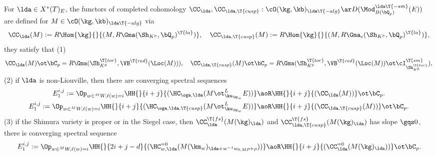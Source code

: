 \documentclass[article, a4paper, twoside]{universal}
\begin{document}
\begin{thm}
    For $\lda\in X^{*}(T)_{E}$, the functors of completed cohomology $\CC_{\lda},\CC_{\lda,\T{cusp}}:\cO(\kg,\kb)_{\lda\T{-alg}}\ar D(\Mod_{B(\bQ_{p})}^{\lda\T{-sm}}(E))$ are defined for $M\in\cO(\kg,\kb)_{\lda\T{-alg}}$ via
    \[
        \CC_{\lda}(M):=R\Hom{\kg}{}{(M,R\Gma(\Sh_{K^{p}},\bQ_{p})^{\T{la}})},\quad \CC_{\lda,\T{cusp}}(M):=R\Hom{\kg}{}{(M,R\Gma_{c}(\Sh_{K^{p}},\bQ_{p})^{\T{la}})},
    \]
    they satisfy that (1)
    \[
        \CC_{\lda}(M)\ot\bC_{p}=R\Gma(\Sh_{K^{p}}^{\T{tor}},\VB^{\T{red}}(\Loc(M))),\quad \CC_{\lda,\T{cusp}}(M)\ot\bC_{p}=R\Gma(\Sh_{K^{p}}^{\T{tor}},\VB^{\T{red}}(\Loc(M))\ot\cI_{\Sh_{K^{p}}^{\T{tor}}}^{\T{sm}}),
    \]
    (2) if $\lda$ is non-Liouville, then there are converging spectral sequences
    \begin{align*}
      E_{1}^{i,j}:=\Op_{w\in{}^{M}W, \ell(w)=i}\HH{}{i+j}{(\HC_{\oga,\lda}(M\ot_{\ku_{\kp_{w}}}^{L}E))}&\aoR\HH{}{i+j}{(\CC_{\lda}(M))}\ot\bC_{p}.\\
      E_{1}^{i,j}:=\Op_{w\in{}^{M}W, \ell(w)=i}\HH{}{i+j}{(\HC_{\oga,\lda,\T{cusp}}(M\ot_{\ku_{\kp_{w}}}^{L}E))}&\aoR\HH{}{i+j}{(\CC_{\lda,\T{cusp}}(M))}\ot\bC_{p}.
    \end{align*}
    (3) if the Shimura variety is proper or in the Siegel case, then $\CC_{\lda}^{\T{fs}}(M(\kg)_{\lda})$ and $\CC_{\lda,\T{cusp}}^{\T{fs}}(M(\kg)_{\lda})$ has slope $\gqs0$, there is converging spectral sequence
    \[
        E_{1}^{i,j}:=\Op_{w\in{}^{M}W, \ell(w)=i}\HH{}{2i+j-d}{(\HC_{w,\lda}^{=0}(M(\km_{w})_{\lda+w^{-1}w_{0,M}\rho+\rho}))}\aoR\HH{}{i+j}{(\CC_{\lda}^{=0}(M(\kg)_{\lda}))}\ot\bC_{p}.
    \]
\end{thm}
\end{document}
